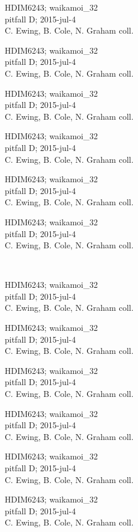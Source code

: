 \documentclass[2pt]{extarticle}
\begin{document}
\noindent
\parbox{0.16\textwidth}{\tiny \raggedright \rule[-0.3\baselineskip]{0pt}{10pt}HDIM6243; waikamoi\_32\\ pitfall D; 2015-jul-4\\ C. Ewing, B. Cole, N. Graham coll.}
\parbox{0.16\textwidth}{\tiny \raggedright \rule[-0.3\baselineskip]{0pt}{10pt}HDIM6243; waikamoi\_32\\ pitfall D; 2015-jul-4\\ C. Ewing, B. Cole, N. Graham coll.}
\parbox{0.16\textwidth}{\tiny \raggedright \rule[-0.3\baselineskip]{0pt}{10pt}HDIM6243; waikamoi\_32\\ pitfall D; 2015-jul-4\\ C. Ewing, B. Cole, N. Graham coll.}
\parbox{0.16\textwidth}{\tiny \raggedright \rule[-0.3\baselineskip]{0pt}{10pt}HDIM6243; waikamoi\_32\\ pitfall D; 2015-jul-4\\ C. Ewing, B. Cole, N. Graham coll.}
\parbox{0.16\textwidth}{\tiny \raggedright \rule[-0.3\baselineskip]{0pt}{10pt}HDIM6243; waikamoi\_32\\ pitfall D; 2015-jul-4\\ C. Ewing, B. Cole, N. Graham coll.}
\parbox{0.16\textwidth}{\tiny \raggedright \rule[-0.3\baselineskip]{0pt}{10pt}HDIM6243; waikamoi\_32\\ pitfall D; 2015-jul-4\\ C. Ewing, B. Cole, N. Graham coll.} \\ 
\vspace{0.001in} 

\noindent
\parbox{0.16\textwidth}{\tiny \raggedright \rule[-0.3\baselineskip]{0pt}{10pt}HDIM6243; waikamoi\_32\\ pitfall D; 2015-jul-4\\ C. Ewing, B. Cole, N. Graham coll.}
\parbox{0.16\textwidth}{\tiny \raggedright \rule[-0.3\baselineskip]{0pt}{10pt}HDIM6243; waikamoi\_32\\ pitfall D; 2015-jul-4\\ C. Ewing, B. Cole, N. Graham coll.}
\parbox{0.16\textwidth}{\tiny \raggedright \rule[-0.3\baselineskip]{0pt}{10pt}HDIM6243; waikamoi\_32\\ pitfall D; 2015-jul-4\\ C. Ewing, B. Cole, N. Graham coll.}
\parbox{0.16\textwidth}{\tiny \raggedright \rule[-0.3\baselineskip]{0pt}{10pt}HDIM6243; waikamoi\_32\\ pitfall D; 2015-jul-4\\ C. Ewing, B. Cole, N. Graham coll.}
\parbox{0.16\textwidth}{\tiny \raggedright \rule[-0.3\baselineskip]{0pt}{10pt}HDIM6243; waikamoi\_32\\ pitfall D; 2015-jul-4\\ C. Ewing, B. Cole, N. Graham coll.}
\parbox{0.16\textwidth}{\tiny \raggedright \rule[-0.3\baselineskip]{0pt}{10pt}HDIM6243; waikamoi\_32\\ pitfall D; 2015-jul-4\\ C. Ewing, B. Cole, N. Graham coll.} \\ 
\vspace{0.001in} 
\end{document}
